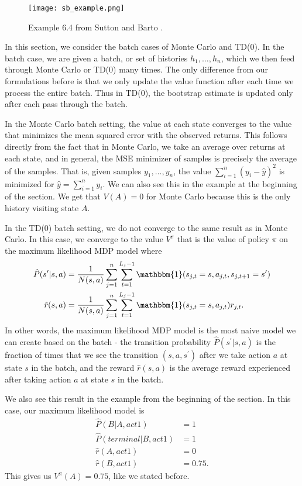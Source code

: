 \documentclass{article}
\begin{document}
\begin{figure}
    \centering
    \texttt{[image: sb\_example.png]}
    \caption{Example 6.4 from Sutton and Barto \cite{sb18}.} \label{fig:sb-example}
\end{figure}

In this section, we consider the batch cases of Monte Carlo and TD(0).  In the batch case, we are given a batch, or set of histories $h_1, \ldots, h_n$, which we then feed through Monte Carlo or TD(0) many times.  The only difference from our formulations before is that we only update the value function after each time we process the entire batch.  Thus in TD(0), the bootstrap estimate is updated only after each pass through the batch.

In the Monte Carlo batch setting, the value at each state converges to the value that minimizes the mean squared error with the observed returns.  This follows directly from the fact that in Monte Carlo, we take an average over returns at each state, and in general, the MSE minimizer of samples is precisely the average of the samples.  That is, given samples $y_1, \ldots, y_n$, the value $\sum_{i=1}^n (y_i - \hat{y})^2$ is minimized for $\hat{y} = \sum_{i=1}^n y_i$.  We can also see this in the example at the beginning of the section.  We get that $V(A) = 0$ for Monte Carlo because this is the only history visiting state $A$.

In the TD(0) batch setting, we do not converge to the same result as in Monte Carlo.  In this case, we converge to the value $V^\pi$ that is the value of policy $\pi$ on the maximum likelihood MDP model where
\begin{align}
\hat{P}(s^\prime | s,a) &= \frac{1}{N(s,a)} \sum_{j=1}^n \sum_{t=1}^{L_j-1} \mathbbm{1}(s_{j,t} = s, a_{j,t}, s_{j,t+1}=s^\prime) \\
\hat{r}(s,a) &= \frac{1}{N(s,a)} \sum_{j=1}^n \sum_{t=1}^{L_j-1} \mathbbm{1}(s_{j,t} = s, a_{j,t}) r_{j,t}.
\end{align}
In other words, the maximum likelihood MDP model is the most naive model we can create based on the batch - the transition probability $\hat{P}(s^\prime | s,a)$ is the fraction of times that we see the transition $(s, a, s^\prime)$ after we take action $a$ at state $s$ in the batch, and the reward $\hat{r}(s,a)$ is the average reward experienced after taking action $a$ at state $s$ in the batch.

We also see this result in the example from the beginning of the section.  In this case, our maximum likelihood model is
\begin{align}
\hat{P}(B | A, act1) &= 1 \\
\hat{P}(terminal | B, act1) &= 1 \\
\hat{r}(A, act1) &= 0 \\
\hat{r}(B, act1) &= 0.75.
\end{align}
This gives us $V^\pi(A) = 0.75$, like we stated before.
\end{document}

